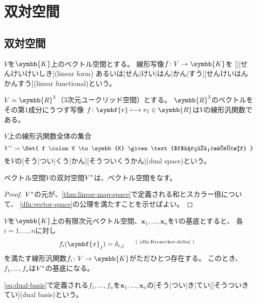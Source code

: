 \documentclass[../sotsu.tex]{subfiles}
\begin{document}
\section{双対空間}

\subsection{双対空間}

\begin{definition}[線形汎関数]
    $V$を$\symbb{K}$上のベクトル空間とする。
    線形写像$f \colon V \to \symbb{K}$を
    [][せんけいけいしき](linear form)
    あるいは[せん|けい|はん|かん|すう][せんけいはんかんすう](linear functional)という。
\end{definition}

\begin{example}
    $V = \symbb{R}^3$（3次元ユークリッド空間）とする。
    $\symbb{R}^3$のベクトルをその第1成分にうつす写像
    $f \colon \symbf{v} \longmapsto v_1 \in \symbb{R}$は$V$の線形汎関数である。
\end{example}


\begin{definition}[双対空間]
    \label{dfn:dual-space}
    $V$上の線形汎関数全体の集合
    \begin{equation}
        \dual{V}  \coloneq  \Set{  f \colon V \to \symbb{K}  \given  \text{$f$は線形汎関数}  }
    \end{equation}
    を$V$の[そう|つい|くう|かん][そうついくうかん](dual space)という\cite[\S 4.1]{saito-lin-2007}。
\end{definition}


\begin{proposition}
    ベクトル空間$V$の双対空間${V}^*$は、ベクトル空間をなす\cite[\S 4.1]{saito-lin-2007}。
\end{proposition}

\begin{proof}
    ${V}^*$の元が、\cref{thm:linear-map-space}で定義される和とスカラー倍について、
    \cref{dfn:vector-space}の公理を満たすことを示せばよい。
\end{proof}


\begin{definition}[双対基底]
    \label{dfn:dual-basis}
    $V$を$\symbb{K}$上の有限次元ベクトル空間、$\symbf{x}_1, \dots, \symbf{x}_n$を$V$の基底とすると、
    各$i = 1, \dots, n$に対し
    \begin{equation}
        \label{eq:dual-basis}
        f_i (\symbf{x}_j) = \delta_{i, j} \quad \text{\refdfn{dfn:Kronecker-delta}}
    \end{equation}
    を満たす線形汎関数$f_i \colon V \to \symbb{K}$がただひとつ存在する。
    このとき、$f_1, \dots, f_n$は${V}^*$の基底になる。

    \cref{eq:dual-basis}で定義される$f_1, \dots, f_n$を$\symbf{x}_1, \dots, \symbf{x}_n$の[そう|つい|き|てい][そうついきてい](dual basis)という。
\end{definition}
\end{document}
